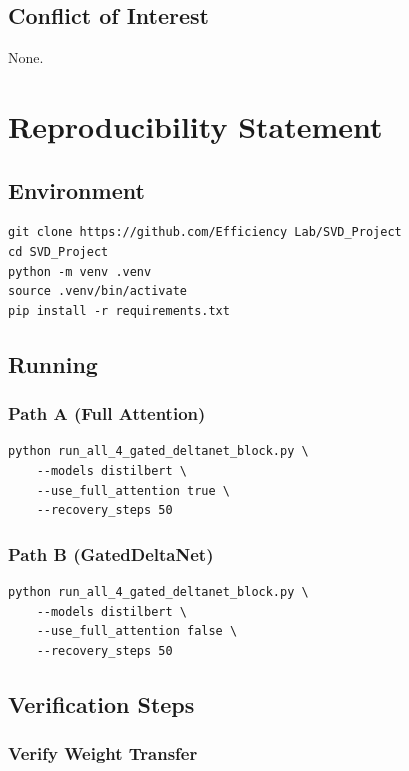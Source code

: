 \subsection{Conflict of Interest}

None.




\section{Reproducibility Statement}

\subsection{Environment}

\begin{lstlisting}
git clone https://github.com/Efficiency Lab/SVD_Project
cd SVD_Project
python -m venv .venv
source .venv/bin/activate
pip install -r requirements.txt
\end{lstlisting}

\subsection{Running}

\subsubsection{Path A (Full Attention)}

\begin{lstlisting}
python run_all_4_gated_deltanet_block.py \
    --models distilbert \
    --use_full_attention true \
    --recovery_steps 50
\end{lstlisting}

\subsubsection{Path B (GatedDeltaNet)}

\begin{lstlisting}
python run_all_4_gated_deltanet_block.py \
    --models distilbert \
    --use_full_attention false \
    --recovery_steps 50
\end{lstlisting}

\subsection{Verification Steps}

\subsubsection{Verify Weight Transfer}

